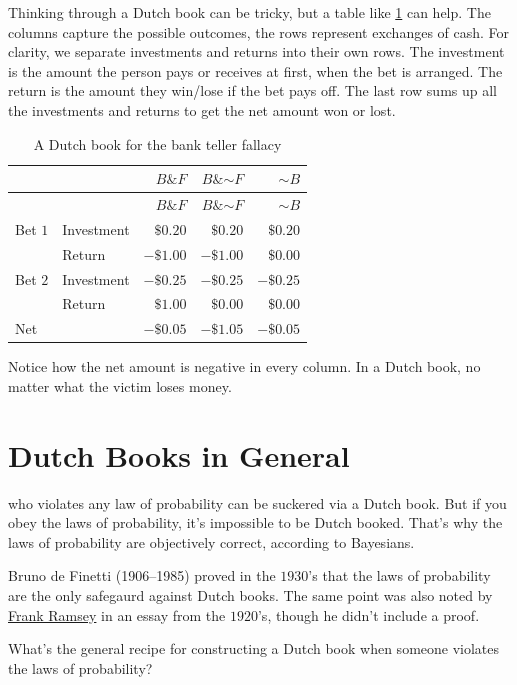 \documentclass[justified]{tufte-book}
\renewcommand{\neg}{\mathbin{\sim}}
\renewcommand{\wedge}{\mathbin{\&}}
\theoremstyle{definition}
\theoremstyle{definition}
\theoremstyle{definition}
\theoremstyle{remark}
\begin{document}
Thinking through a Dutch book can be tricky, but a table like
\ref{tab:banktellerdb} can help. The columns capture the possible
outcomes, the rows represent exchanges of cash. For clarity, we separate
investments and returns into their own rows. The investment is the
amount the person pays or receives at first, when the bet is arranged.
The return is the amount they win/lose if the bet pays off. The last row
sums up all the investments and returns to get the net amount won or
lost.

\begin{longtable}[]{@{}llrrr@{}}
\caption{\label{tab:banktellerdb}A Dutch book for the bank teller
fallacy}\tabularnewline
\toprule
& & \(B \wedge F\) & \(B \wedge \neg F\) & \(\neg B\)\tabularnewline
\midrule
\endfirsthead
\toprule
& & \(B \wedge F\) & \(B \wedge \neg F\) & \(\neg B\)\tabularnewline
\midrule
\endhead
Bet \(1\) & Investment & \(\$0.20\) & \(\$0.20\) &
\(\$0.20\)\tabularnewline
& Return & \(-\$1.00\) & \(-\$1.00\) & \(\$0.00\)\tabularnewline
Bet \(2\) & Investment & \(-\$0.25\) & \(-\$0.25\) &
\(-\$0.25\)\tabularnewline
& Return & \(\$1.00\) & \(\$0.00\) & \(\$0.00\)\tabularnewline
Net & & \(-\$0.05\) & \(-\$1.05\) & \(-\$0.05\)\tabularnewline
\bottomrule
\end{longtable}

Notice how the net amount is negative in every column. In a Dutch book,
no matter what the victim loses money.

\hypertarget{dutch-books-in-general}{%
\section{Dutch Books in General}\label{dutch-books-in-general}}

 who violates any law of probability can be suckered
via a Dutch book. But if you obey the laws of probability, it's
impossible to be Dutch booked. That's why the laws of probability are
objectively correct, according to Bayesians.

\begin{marginfigure}
Bruno de Finetti (1906--1985) proved in the \(1930\)'s that the laws of
probability are the only safegaurd against Dutch books. The same point
was also noted by \protect\hyperlink{fig:ramsey}{Frank Ramsey} in an
essay from the \(1920\)'s, though he didn't include a proof.
\end{marginfigure}

What's the general recipe for constructing a Dutch book when someone
violates the laws of probability?
\end{document}
